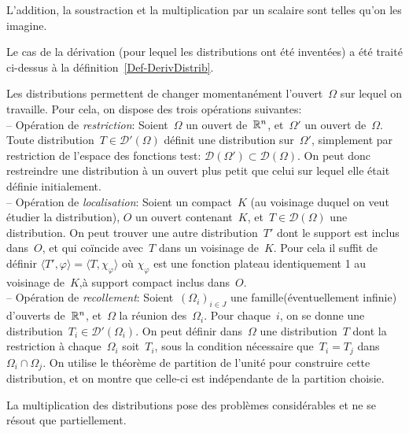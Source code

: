 \begin{remarque}
L'addition, la soustraction et la multiplication par un scalaire sont telles qu'on les imagine.

Le cas de la dérivation (pour lequel les distributions ont été inventées) a été traité ci-dessus à la définition~\ref{Def-DerivDistrib}.

\medskip
Les distributions permettent de changer momentanément l'ouvert~$\Omega$ sur lequel on travaille. Pour cela, on dispose des trois opérations suivantes:\\
-- Opération de \emph{restriction}:
Soient~$\Omega$ un ouvert de~$\mathbb R^n$, et~$\Omega'$ un ouvert de~$\Omega$. Toute distribution~$T\in\mathcal{D}'(\Omega)$ définit une distribution sur~$\Omega'$, simplement par restriction de l'espace des fonctions test: $\mathcal{D}(\Omega') \subset \mathcal{D}(\Omega)$. On peut donc restreindre une distribution à un ouvert plus petit que celui sur lequel elle était définie initialement.\\
-- Opération de \emph{localisation}: Soient un compact~$K$ (au voisinage duquel on veut étudier la distribution), $O$ un ouvert contenant~$K$, et~$T\in\mathcal{D}(\Omega)$ une distribution. On peut trouver une autre distribution~$T'$ dont le support est inclus dans~$O$, et qui coïncide avec~$T$ dans un voisinage de~$K$. Pour cela il suffit de définir $\langle T',\varphi\rangle = \langle T,\chi_\varphi\rangle$ où $\chi_\varphi$ est une fonction plateau identiquement 1 au voisinage de~$K$,à support compact inclus dans~$O$.\\
-- Opération de \emph{recollement}: Soient~$(\Omega_i)_{i\in J}$ une famille(éventuellement
infinie) d'ouverts de~$\mathbb R^n$, et~$\Omega$ la réunion des~$\Omega_i$. Pour chaque~$i$, on se donne une distribution~$T_i\in\mathcal{D}'(\Omega_i)$. On peut définir dans~$\Omega$ une distribution~$T$ dont la restriction à chaque~$\Omega_i$ soit~$T_i$, sous la condition nécessaire que~$T_i=T_j$ dans~$\Omega_i\cap\Omega_j$. On utilise le théorème de partition de l'unité pour construire cette distribution, et on montre que celle-ci est indépendante de la partition choisie.

\medskip
La multiplication des distributions pose des problèmes considérables et ne se résout que partiellement.
\end{remarque}

